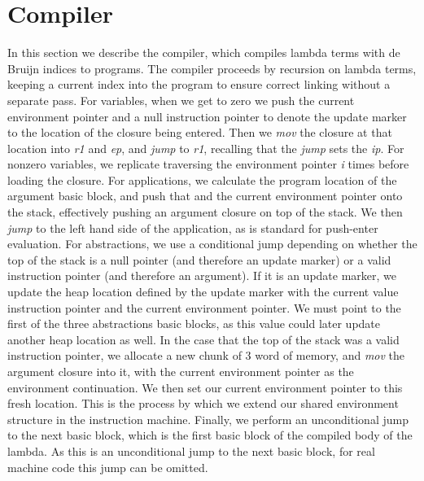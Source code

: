 \section{Compiler} \label{sec:compiler}

In this section we describe the compiler, which compiles lambda terms with
de Bruijn indices to programs. The compiler proceeds by recursion on lambda
terms, keeping a current index into the program to ensure correct linking
without a separate pass. For variables, when we get to zero we push the current
environment pointer and a null instruction pointer to denote the update marker
to the location of the closure being entered. Then we \textit{mov} the closure
at that location into \textit{r1} and \textit{ep}, and \textit{jump} to
\textit{r1}, recalling that the \textit{jump} sets the \textit{ip}. For 
nonzero variables, we replicate traversing the environment pointer \textit{i}
times before loading the closure.  For applications, we calculate the program
location of the argument basic block, and push that and the current environment
pointer onto the stack, effectively pushing an argument closure on top of the
stack. We then \textit{jump} to the left hand side of the application, as is
standard for push-enter evaluation. For abstractions, we use a conditional jump
depending on whether the top of the stack is a null pointer (and therefore an
update marker) or a valid instruction pointer (and therefore an argument). If it
is an update marker, we update the heap location defined by the update marker
with the current value instruction pointer and the current environment pointer.
We must point to the first of the three abstractions basic blocks, as this value
could later update another heap location as well. In the case that the top of
the stack was a valid instruction pointer, we allocate a new chunk of 3 word of
memory, and \textit{mov} the argument closure into it, with the current
environment pointer as the environment continuation. We then set our current
environment pointer to this fresh location. This is the process by which we
extend our shared environment structure in the instruction machine. Finally, we
perform an unconditional jump to the next basic block, which is the first basic
block of the compiled body of the lambda. As this is an unconditional jump to
the next basic block, for real machine code this jump can be omitted. 

